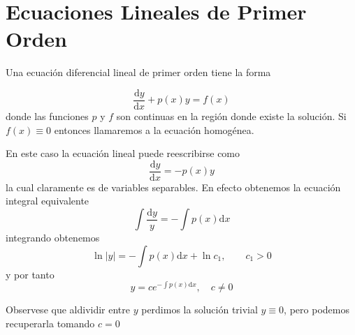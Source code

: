 \section{Ecuaciones Lineales de Primer Orden}

Una ecuación diferencial lineal de primer orden tiene la forma

$$
\frac{\mathrm{d}y}{\mathrm{d}x}+p(x)y=f(x)
$$
donde las funciones $p$ y $f$ son continuas en la región donde existe la solución. Si $f(x)\equiv0$ entonces llamaremos a la ecuación homogénea.

En este caso la ecuación lineal puede reescribirse como
$$
\frac{\mathrm{d}y}{\mathrm{d}x}=-p(x)y
$$
la cual claramente es de variables separables. En efecto obtenemos la ecuación integral equivalente 
$$
\int\frac{\mathrm{d}y}{y}=-\int p(x)\mathrm{d}x
$$
integrando obtenemos
$$
\ln |y|=-\int p(x)\mathrm{d}x+\ln c_1,\qquad c_1>0
$$
y por tanto
$$
y=ce^{-\int p(x)\mathrm{d}x}, \quad c\neq 0
$$

Observese que aldividir entre $y$ perdimos la solución trivial $y\equiv 0$, pero podemos recuperarla tomando $c=0$


